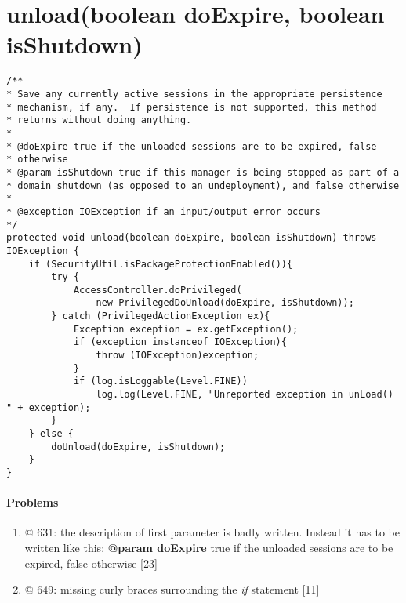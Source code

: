 \section*{unload(boolean doExpire, boolean isShutdown)}
\lstset{firstnumber=626}
\begin{lstlisting}
/**
* Save any currently active sessions in the appropriate persistence
* mechanism, if any.  If persistence is not supported, this method
* returns without doing anything.
*
* @doExpire true if the unloaded sessions are to be expired, false
* otherwise
* @param isShutdown true if this manager is being stopped as part of a
* domain shutdown (as opposed to an undeployment), and false otherwise
*
* @exception IOException if an input/output error occurs
*/ 
protected void unload(boolean doExpire, boolean isShutdown) throws IOException {
	if (SecurityUtil.isPackageProtectionEnabled()){       
		try {
			AccessController.doPrivileged(
				new PrivilegedDoUnload(doExpire, isShutdown));
		} catch (PrivilegedActionException ex){
			Exception exception = ex.getException();
			if (exception instanceof IOException){
				throw (IOException)exception;
			}
			if (log.isLoggable(Level.FINE))
				log.log(Level.FINE, "Unreported exception in unLoad() " + exception);
		}
	} else {
		doUnload(doExpire, isShutdown);
	}       
}
\end{lstlisting}
\paragraph{Problems}
\begin{enumerate}
	\item @ 631: the description of first parameter is badly written. Instead it has to be written like this: \textbf{@param doExpire} true if the unloaded sessions are to be expired, false otherwise [23]
	\item @ 649: missing curly braces surrounding the \textit{if} statement [11]
\end{enumerate}

